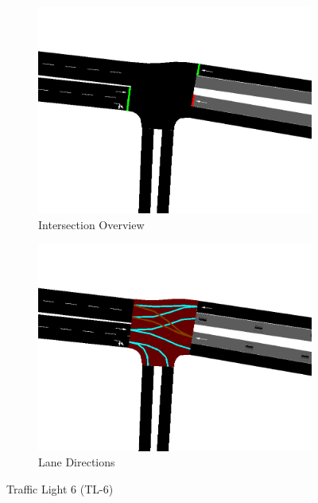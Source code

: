 \begin{figure}[h]
    \centering
    \begin{subfigure}{0.45\textwidth}
        \centering
        \includegraphics[width=\linewidth]{images/methodology/tl-6-street.png}
        \caption{Intersection Overview}
    \end{subfigure}
    \hfill
    \begin{subfigure}{0.45\textwidth}
        \centering
        \includegraphics[width=\linewidth]{images/methodology/tl-6-directions.png}
        \caption{Lane Directions}
    \end{subfigure}
    \caption{Traffic Light 6 (TL-6)}
    \label{fig:tl-6}
\end{figure}

